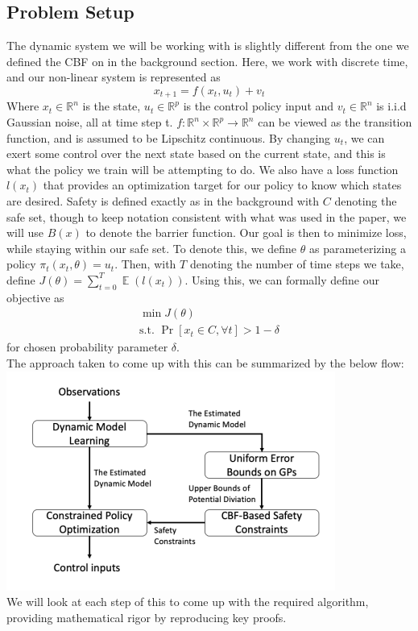 \documentclass{article}
\newcommand{\R}{\ensuremath{\mathbb{R}}}
\DeclareMathOperator*{\E}{\mathbb{E}}
\begin{document}
\subsection{Problem Setup}
The dynamic system we will be working with is slightly different from the one we defined the CBF on in the background section. Here, we work with discrete time, and our non-linear system is represented as 
\begin{equation}
    x_{t + 1} = f(x_t, u_t) + v_t
\end{equation}
Where $x_t \in \R^n$ is the state, $u_t\in \R^p$ is the control policy input and $v_t \in \R^n$ is i.i.d Gaussian noise, all at time step t. 
$f: \R^n\times\R^p \rightarrow \R^n$ can be viewed as the transition function, and is assumed to be Lipschitz continuous. By changing $u_t$, we can exert some control over the next state based on the current state, and this is what the policy we train will be attempting to do. We also have a loss function $l(x_t)$ that provides an optimization target for our policy to know which states are desired. Safety is defined exactly as in the background with $C$ denoting the safe set, though to keep notation consistent with what was used in the paper, we will use $B(x)$ to denote the barrier function. Our goal is then to minimize loss, while staying within our safe set. To denote this, we define $\theta$ as parameterizing a policy $\pi_t(x_t, \theta) = u_t$. Then, with $T$ denoting the number of time steps we take, define $J(\theta) = \sum_{t = 0}^T \E(l(x_t))$. Using this, we can formally define our objective as
\begin{equation}
\begin{split}
        \min J(\theta) \\
    \text{s.t. } \Pr[x_t\in C, \forall t] > 1 - \delta
\end{split}
\end{equation}  for chosen probability parameter $\delta$. \\
The approach taken to come up with this can be summarized by the below flow: \\
\includegraphics[scale = 1.1]{Flow.png} \\
We will look at each step of this to come up with the required algorithm, providing mathematical rigor by reproducing key proofs.
\end{document}
